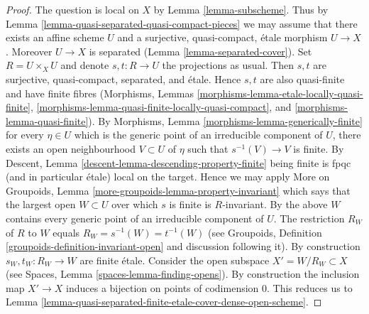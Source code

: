 \documentclass[10pt,a4paper]{amsart}
\theoremstyle{plain}
\theoremstyle{definition}
\theoremstyle{remark}
\numberwithin{equation}{subsection}
\begin{document}
\begin{proof}
The question is local on $X$ by Lemma \ref{lemma-subscheme}.
Thus by Lemma \ref{lemma-quasi-separated-quasi-compact-pieces}
we may assume that there exists an affine scheme $U$ and a
surjective, quasi-compact, \'etale morphism $U \to X$.
Moreover $U \to X$ is separated (Lemma \ref{lemma-separated-cover}).
Set $R = U \times_X U$ and denote $s, t : R \to U$ the projections
as usual. Then $s, t$ are surjective, quasi-compact, separated, and
\'etale. Hence $s, t$ are also quasi-finite and have finite fibres
(Morphisms,
Lemmas \ref{morphisms-lemma-etale-locally-quasi-finite},
\ref{morphisms-lemma-quasi-finite-locally-quasi-compact}, and
\ref{morphisms-lemma-quasi-finite}).
By Morphisms, Lemma \ref{morphisms-lemma-generically-finite}
for every $\eta \in U$ which is the generic point of an
irreducible component of $U$, there exists an open neighbourhood
$V \subset U$ of $\eta$ such that $s^{-1}(V) \to V$ is finite. By
Descent, Lemma \ref{descent-lemma-descending-property-finite}
being finite is fpqc (and in particular \'etale) local on the target.
Hence we may apply
More on Groupoids, Lemma \ref{more-groupoids-lemma-property-invariant}
which says that the largest open $W \subset U$ over which $s$ is
finite is $R$-invariant. By the above $W$ contains every
generic point of an irreducible component of $U$.
The restriction $R_W$ of $R$ to $W$ equals $R_W = s^{-1}(W) = t^{-1}(W)$
(see Groupoids, Definition \ref{groupoids-definition-invariant-open}
and discussion following it).
By construction $s_W, t_W : R_W \to W$ are finite \'etale.
Consider the open subspace $X' = W/R_W \subset X$ (see
Spaces, Lemma \ref{spaces-lemma-finding-opens}).
By construction the inclusion map $X' \to X$
induces a bijection on points of codimension $0$.
This reduces us to
Lemma \ref{lemma-quasi-separated-finite-etale-cover-dense-open-scheme}.
\end{proof}
\end{document}
